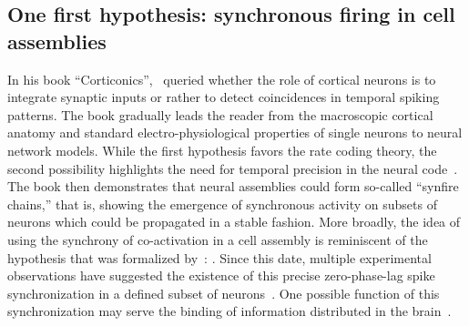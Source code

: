 \documentclass[brainsci, %
               review,submit,pdftex,moreauthors
               ]{Definitions/mdpi}
\begin{document}
\subsection{One first hypothesis: synchronous firing in cell assemblies}
%
In his book ``Corticonics'',~\citet{abeles_corticonics_1991} queried whether the role of cortical neurons is to integrate synaptic inputs or rather to detect coincidences in temporal spiking patterns. The book gradually leads the reader from the macroscopic cortical anatomy and standard electro-physiological properties of single neurons to neural network models. While the first hypothesis favors the rate coding theory, the second possibility highlights the need for temporal precision in the neural code~\citep{abeles_role_1982,paugam-moisy_computing_2012}. The book then demonstrates that neural assemblies could form so-called ``synfire chains,'' that is, showing the emergence of synchronous activity on subsets of neurons which could be propagated in a stable fashion. More broadly, the idea of using the synchrony of co-activation in a cell assembly is reminiscent of the hypothesis that was formalized by~\citet{hebb_organization_1949}: . Since this date, multiple experimental observations have suggested the existence of this precise zero-phase-lag spike synchronization in a defined subset of neurons~\citep{harris_organization_2003}. One possible function of this synchronization may serve the binding of information distributed in the brain~\citep{singer_visual_1995, roelfsema_visuomotor_1997}.
\end{document}
